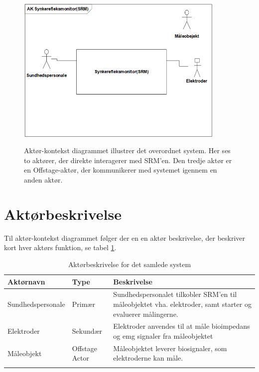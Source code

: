 \begin{figure}[H]
\centering
{\includegraphics[width=10cm]
{Figure/AktoerKontextDiagram}}
\caption{Aktør-kontekst diagrammet illustrer det overordnet system. Her ses to aktører, der direkte interagerer med SRM'en. Den tredje aktør er en Offstage-aktør, der kommunikerer med systemet igennem en anden aktør.      }
\label{fig:sysbeskrivelse}
\end{figure}  

 

\section{Aktørbeskrivelse}
Til aktør-kontekst diagrammet følger der en en aktør beskrivelse, der beskriver kort hver aktørs funktion, se tabel \ref{tab:aktoerbeskrivelse}.    
\begin{table}[H]
\begin{tabularx}{\textwidth}{l l X}
     Aktørnavn	&	Type		&	Beskrivelse \\ \midrule
     Sundhedspersonale   	&  	Primær  	& 	Sundhedspersonalet tilkobler SRM'en til måleobjektet vha. elektroder, samt starter og evaluerer målingerne.     \\ 			  \addlinespace[2mm]
     Elektroder	&	Sekundær	& Elektroder anvendes til at måle bioimpedans og emg signaler fra måleobjektet  	 \\   \addlinespace[2mm]

Måleobjekt	&	Offstage Actor	& Måleobjektet   leverer biosignaler, som elektroderne kan måle.   	 \\   \addlinespace[2mm]
     
   
     \bottomrule                                                                                                                   
    \end{tabularx}
    \caption {Aktørbeskrivelse for det samlede system}
    \label{tab:aktoerbeskrivelse}
	
\end{table}

